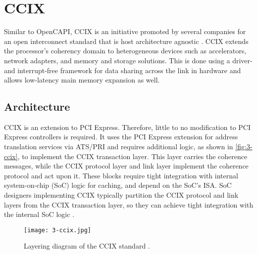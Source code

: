 




\section{CCIX}
Similar to OpenCAPI, CCIX is an initiative promoted by several companies for an open interconnect standard that is host architecture agnostic \cite{ccix-website}. CCIX extends the processor's coherency domain to heterogeneous devices such as accelerators, network adapters, and memory and storage solutions. This is done using a driver- and interrupt-free framework for data sharing across the link in hardware and allows low-latency main memory expansion as well.

\subsection{Architecture}
CCIX is an extension to PCI Express. Therefore, little to no modification to PCI Express controllers is required. It uses the PCI Express extension for address translation services via ATS/PRI \cite{benton} and requires additional logic, as shown in \autoref{fig:3-ccix}, to implement the CCIX transaction layer. This layer carries the coherence messages, while the CCIX protocol layer and link layer implement the coherence protocol and act upon it. These blocks require tight integration with internal system-on-chip (SoC) logic for caching, and depend on the SoC’s ISA. SoC designers implementing CCIX typically partition the CCIX protocol and link layers from the CCIX transaction layer, so they can achieve tight integration with the internal SoC logic \cite{using-ccix}.

\begin{figure}[H]
  \centering
  \texttt{[image: 3-ccix.jpg]}
  \caption{Layering diagram of the CCIX standard \cite{using-ccix}.}
  \label{fig:3-ccix}
\end{figure}


